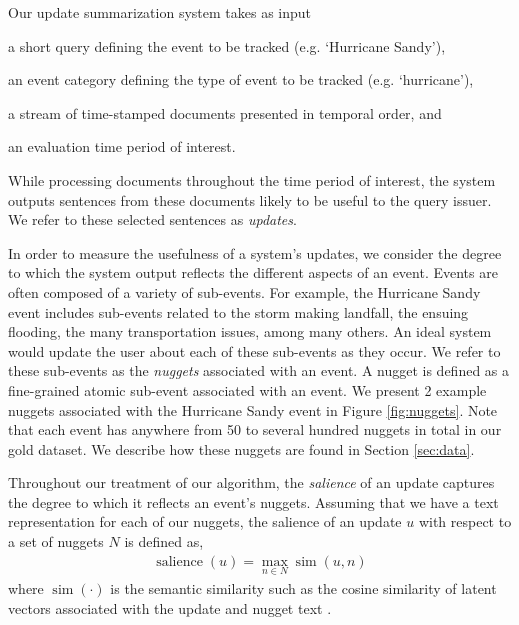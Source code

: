 \label{sec:methods}

Our update summarization system takes as input 
\begin{enumerate*}[label=\itshape\alph*\upshape)]
  \item a short query defining the event to be tracked (e.g. `Hurricane Sandy'), 
  \item an event category defining the type of event to be tracked (e.g. `hurricane'), 
  \item a stream of time-stamped documents %
  presented in temporal order, and \item an evaluation time period of interest.
\end{enumerate*} 
While processing documents
throughout the time period of interest, the system outputs sentences
from these documents likely to be useful to the query issuer.  We refer
to these selected sentences as \emph{updates}.

In order to measure the usefulness of a system's updates, we consider
the degree to which the system output reflects the different
aspects of an event.  Events are often composed of a variety of sub-events.  
For example, the Hurricane Sandy
event includes sub-events related to the storm making landfall,
the ensuing flooding, the many transportation issues, among many
others.  An ideal system would update the user about each of these
sub-events as they occur. %
We refer to these
sub-events as the \emph{nuggets} associated with an event.  A nugget is
defined as a fine-grained atomic sub-event associated with an event.  
We present 2 example nuggets associated with the Hurricane
Sandy event 
in Figure \ref{fig:nuggets}. 
Note that each event has anywhere from 50 to
several hundred nuggets in total in our gold dataset.
We describe how these 
nuggets are found in Section \ref{sec:data}.




Throughout our treatment of our algorithm, the \emph{salience} 
of an update captures the degree to which it reflects an 
event's nuggets.  Assuming that we have a text representation 
for each of our nuggets, the salience of an update $u$  with respect to a set of nuggets $N$ is
defined as,
\begin{align}
\operatorname{salience}(u) = \operatorname{max}_{n \in N} 
\operatorname{sim}(u, n) \label{eq:salience}
\end{align}
where $\operatorname{sim}(\cdot)$ is the semantic similarity such as
the cosine similarity of latent vectors associated with the update and 
nugget text \cite{guo2012simple}. 

